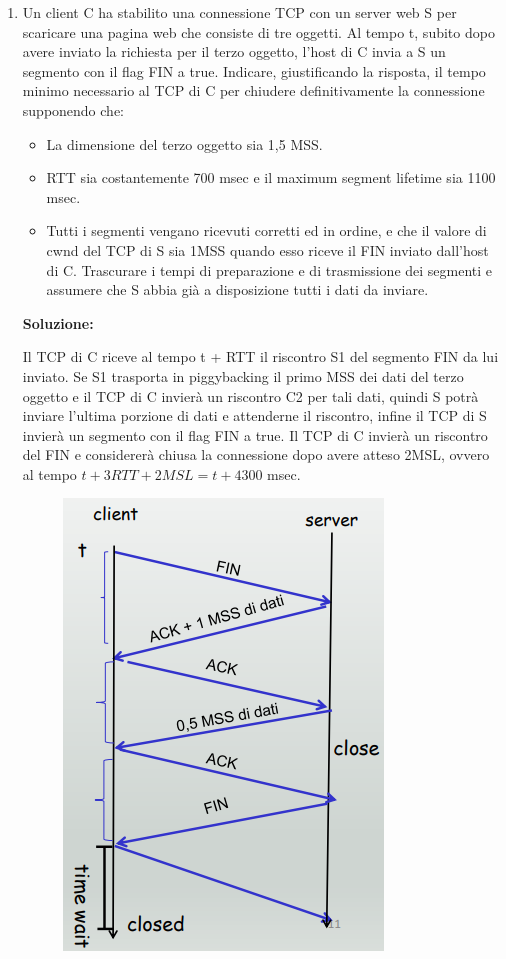 \documentclass[11pt,a4paper,oneside]{book}
\theoremstyle{definition}
\begin{document}
\begin{enumerate}
	\item Un client C ha stabilito una connessione TCP con un server web S per
	      scaricare una pagina web che consiste di tre oggetti. Al tempo t, subito
	      dopo avere inviato la richiesta per il terzo oggetto, l’host di C invia a S
	      un segmento con il flag FIN a true.
	      Indicare, giustificando la risposta,  il tempo minimo necessario al TCP
	      di C per chiudere definitivamente la connessione supponendo che:
	      \begin{itemize}
		      \item La dimensione del terzo oggetto sia 1,5 MSS.
		      \item RTT sia costantemente 700 msec e il maximum segment lifetime sia
		            1100 msec.
		      \item Tutti i segmenti vengano ricevuti corretti ed in ordine, e che il valore
		            di cwnd del TCP di S sia 1MSS quando esso riceve il FIN inviato
		            dall’host di C.
		            Trascurare i tempi di preparazione e di trasmissione dei segmenti e
		            assumere che S abbia già a disposizione tutti i dati da inviare.
	      \end{itemize}
	      \textbf{Soluzione:}
	      \begin{center}
	      \end{center}
	      Il TCP di C riceve al tempo t + RTT il riscontro S1 del segmento FIN da lui
	      inviato. Se S1 trasporta in piggybacking il primo MSS dei dati del terzo oggetto e il TCP di C invierà un riscontro C2 per tali dati, quindi S potrà inviare l’ultima porzione di dati e attenderne il riscontro, infine il TCP
	      di S invierà un segmento con il flag FIN a true. Il TCP di C invierà un riscontro del FIN e considererà chiusa la connessione
	      dopo avere atteso 2MSL, ovvero al tempo $t + 3 RTT + 2 MSL = t + 4300$ msec.
	      \begin{figure}[!h]
		      \includegraphics[scale=0.4]{Immagini/Es3.png}
		      \centering
	      \end{figure}


\end{enumerate}
\end{document}
